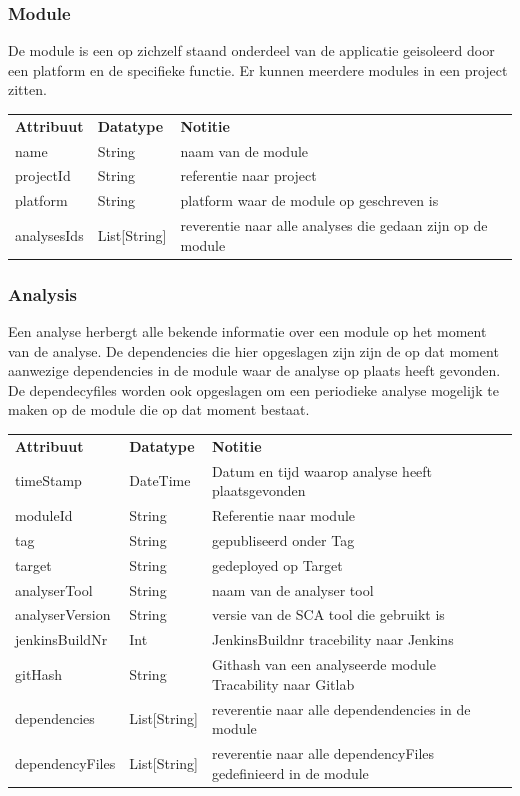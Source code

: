 \subsubsection{Module}\label{subsubsec:module}
De module is een op zichzelf staand onderdeel van de applicatie geisoleerd door een platform en de specifieke functie. Er kunnen meerdere modules in een project zitten.

\begin{tabular}{lll}
    \textbf{Attribuut} & \textbf{Datatype} & \textbf{Notitie}\\
    name  & String & naam van de module\\
    projectId & String & referentie naar project \\
    platform  & String & platform waar de module op geschreven is \\
    analysesIds  & List[String] & reverentie naar alle analyses die gedaan zijn op de module\\
\end{tabular}

\subsubsection{Analysis}\label{subsubsec:analysis}
Een analyse herbergt alle bekende informatie over een module op het moment van de analyse. De dependencies die hier opgeslagen zijn zijn de op dat moment aanwezige dependencies in de module waar de analyse op plaats heeft gevonden. De dependecyfiles worden ook opgeslagen om een periodieke analyse mogelijk te maken op de module die op dat moment bestaat.

\begin{tabular}{lll}
    \textbf{Attribuut} & \textbf{Datatype} & \textbf{Notitie}\\
    timeStamp & DateTime & Datum en tijd waarop analyse heeft plaatsgevonden\\
    moduleId & String & Referentie naar module\\
    tag & String & gepubliseerd onder Tag\\
    target & String & gedeployed op Target\\
    analyserTool & String & naam van de analyser tool\\
    analyserVersion & String & versie van de SCA tool die gebruikt is\\
    jenkinsBuildNr & Int & JenkinsBuildnr tracebility naar Jenkins\\
    gitHash & String & Githash van een analyseerde module Tracability naar Gitlab\\
    dependencies & List[String] & reverentie naar alle dependendencies in de module\\
    dependencyFiles & List[String] & reverentie naar alle dependencyFiles gedefinieerd in de module\\
\end{tabular}


